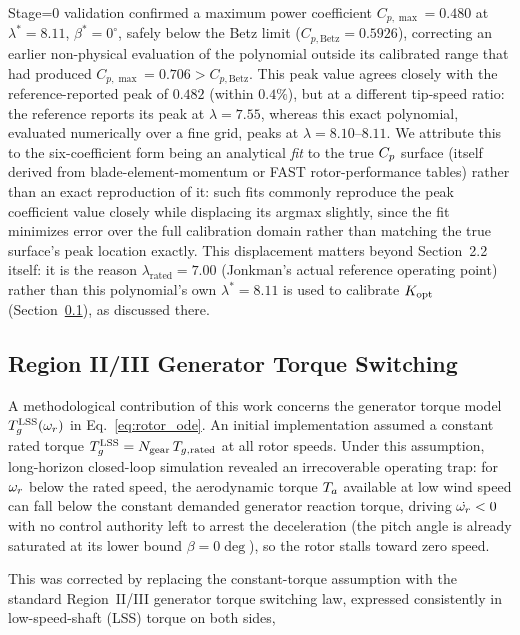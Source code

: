 Stage=0 validation confirmed a maximum power coefficient $C_{p,\max} = 0.480$ at $\lambda^* = 8.11$, $\beta^* = 0^\circ$, safely below the Betz limit ($C_{p,\text{Betz}} = 0.5926$), correcting an earlier non-physical evaluation of the polynomial outside its calibrated range that had produced $C_{p,\max} = 0.706 > C_{p,\text{Betz}}$. This peak value agrees closely with the reference-reported peak of $0.482$ \cite{jonkman2009} (within $0.4\%$), but at a different tip-speed
ratio: the reference reports its peak at $\lambda=7.55$, whereas this
exact polynomial, evaluated numerically over a fine grid, peaks at
$\lambda=8.10$--$8.11$. We attribute this to the six-coefficient form
being an analytical \emph{fit} to the true $C_p$ surface (itself
derived from blade-element-momentum or FAST rotor-performance
tables) rather than an exact reproduction of it: such fits commonly
reproduce the peak coefficient value closely while displacing its
argmax slightly, since the fit minimizes error over the full
calibration domain rather than matching the true surface's peak
location exactly. This displacement matters beyond Section~2.2 itself:
it is the reason $\lambda_{\text{rated}}=7.00$ (Jonkman's actual
reference operating point) rather than this polynomial's own
$\lambda^{*}=8.11$ is used to calibrate $K_{\text{opt}}$
(Section~\ref{subsec:torque_switching}), as discussed there.

\subsection{Region II/III Generator Torque Switching}
\label{subsec:torque_switching}

A methodological contribution of this work concerns the generator torque
model $T_g^{\text{LSS}}(\omega_r)$ in Eq.~\eqref{eq:rotor_ode}. An initial
implementation assumed a constant rated torque
$T_g^{\text{LSS}} = N_{\text{gear}}\,T_{g,\text{rated}}$ at all rotor
speeds. Under this assumption, long-horizon closed-loop simulation revealed
an irrecoverable operating trap: for $\omega_r$ below the rated speed, the
aerodynamic torque $T_a$ available at low wind speed can fall below the
constant demanded generator reaction torque, driving $\dot{\omega_r} < 0$
with no control authority left to arrest the deceleration (the pitch angle
is already saturated at its lower bound $\beta = 0\deg$), so the rotor
stalls toward zero speed.

This was corrected by replacing the constant-torque assumption with the
standard Region~II/III generator torque switching law, expressed
consistently in low-speed-shaft (LSS) torque on both sides,

